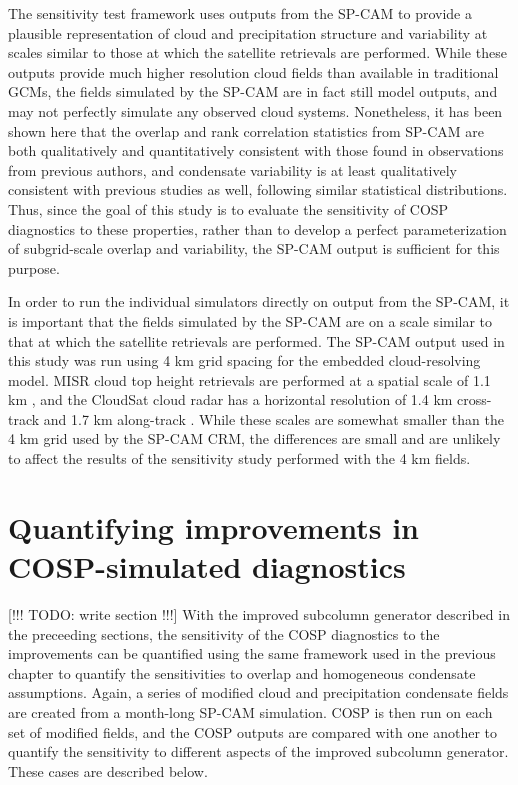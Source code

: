 The sensitivity test framework uses outputs from the SP-CAM to provide a plausible representation of cloud and precipitation structure and variability at scales similar to those at which the satellite retrievals are performed. While these outputs provide much higher resolution cloud fields than available in traditional GCMs, the fields simulated by the SP-CAM are in fact still model outputs, and may not perfectly simulate any observed cloud systems. Nonetheless, it has been shown here that the overlap and rank correlation statistics from SP-CAM are both qualitatively and quantitatively consistent with those found in observations from previous authors, and condensate variability is at least qualitatively consistent with previous studies as well, following similar statistical distributions. Thus, since the goal of this study is to evaluate the sensitivity of COSP diagnostics to these properties, rather than to develop a perfect parameterization of subgrid-scale overlap and variability, the SP-CAM output is sufficient for this purpose. %

In order to run the individual simulators directly on output from the SP-CAM, it is important that the fields simulated by the SP-CAM are on a scale similar to that at which the satellite retrievals are performed. The SP-CAM output used in this study was run using 4 km grid spacing for the embedded cloud-resolving model. MISR cloud top height retrievals are performed at a spatial scale of 1.1 km \citep{moroney_et_al_2002}, and the CloudSat cloud radar has a horizontal resolution of 1.4 km cross-track and 1.7 km along-track \citep{tanelli_et_al_2008}. While these scales are somewhat smaller than the 4 km grid used by the SP-CAM CRM, the differences are small and are unlikely to affect the results of the sensitivity study performed with the 4 km fields.

\section{Quantifying improvements in COSP-simulated diagnostics}
[!!! TODO: write section !!!]
With the improved subcolumn generator described in the preceeding sections, the sensitivity of the COSP diagnostics to the improvements can be quantified using the same framework used in the previous chapter to quantify the sensitivities to overlap and homogeneous condensate assumptions. Again, a series of modified cloud and precipitation condensate fields are created from a month-long SP-CAM simulation. COSP is then run on each set of modified fields, and the COSP outputs are compared with one another to quantify the sensitivity to different aspects of the improved subcolumn generator. These cases are described below.

